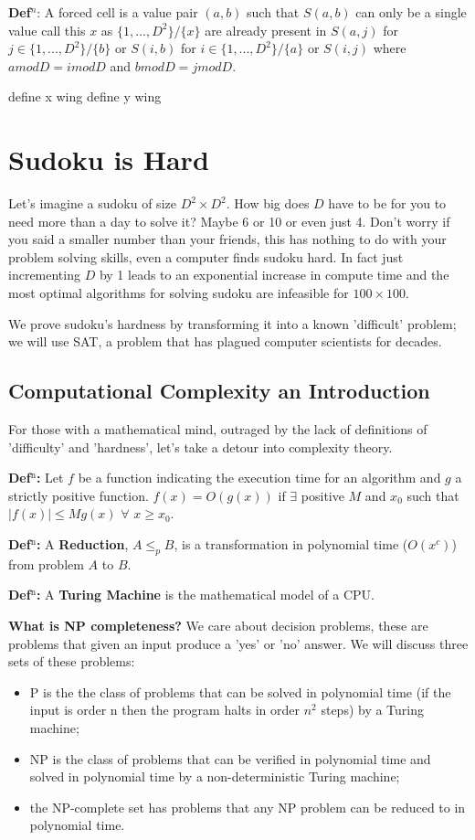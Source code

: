 \documentclass[a4paper,12pt]{article}
\begin{document}
\textbf{Def$^n$}: A forced cell is a value pair $(a,b)$ such that $S(a,b)$ can only be a single value call this $x$ as $\{1,...,D^2\}/\{x\}$ are already present in $S(a,j)$ for $j \in\{1,...,D^2\}/\{b\}$ or $S(i,b)$ for $i \in\{1,...,D^2\}/\{a\}$ or $S(i,j)$ where $a mod D = i mod D$ and $b mod D  =  j mod D$.

define x wing
define y wing
\section{Sudoku is Hard}

Let's imagine a sudoku of size $D^2\times D^2$. How big does $D$ have to be for you to need more than a day to solve it? Maybe 6 or 10 or even just 4. Don't worry if you said a smaller number than your friends, this has nothing to do with your problem solving skills, even a computer finds sudoku hard. In fact just incrementing $D$ by 1 leads to an exponential increase in compute time and the most optimal algorithms for solving sudoku are infeasible for $100 \times 100$.

We prove sudoku's hardness by transforming it into a known 'difficult' problem; we will use SAT, a problem that has plagued computer scientists for decades. 

\subsection{Computational Complexity an Introduction}

For those with a mathematical mind, outraged by the lack of definitions of 'difficulty' and 'hardness', let's take a detour into complexity theory. 

\textbf{Def$^\text{n}$:} Let $f$ be a function indicating the execution time for an algorithm and $g$ a strictly positive function. $f(x)=O (g(x))$ if $\exists$ positive $ M$ and $x_0$ such that $|f(x)|\leq Mg(x)$ $\forall$ $x\geq x_0$.

\textbf{Def$^\text{n}$:} A \textbf{Reduction}, $A \leq_p B$, is a transformation in polynomial time ($O(x^c)$) from problem $A$ to $B$.
	
\textbf{Def$^\text{n}$:} A \textbf{Turing Machine} is the mathematical model of a CPU.

	 
\textbf{What is NP completeness?}
We care about decision problems, these are problems that given an input  produce a 'yes' or 'no' answer. We will discuss three sets of these problems: 
\begin{itemize}
	\item{P is the the class of problems that can be solved in polynomial time (if the input is order n then the program halts in order $n^2$ steps) by a Turing machine;} 
	\item{NP is the class of problems that can be verified in polynomial time and solved in polynomial time by a non-deterministic Turing machine;} 
	\item{the NP-complete set has problems that any NP problem can be reduced to in polynomial time.} 
\end{itemize}
\end{document}
